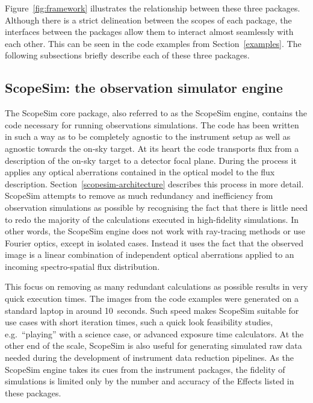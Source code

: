 Figure~\ref{fig:framework} illustrates the relationship between these three packages.
Although there is a strict delineation between the scopes of each package, the interfaces between the packages allow them to interact almost seamlessly with each other.
This can be seen in the code examples from Section~\ref{examples}.
The following subsections briefly describe each of these three packages.

\subsection{ScopeSim: the observation simulator engine}
\label{scopesim-the-observation-simulator-engine}

The ScopeSim core package, also referred to as the ScopeSim engine, contains the code necessary for running observations simulations.
The code has been written in such a way as to be completely agnostic to the instrument setup as well as agnostic towards the on-sky target.
At its heart the code transports flux from a description of the on-sky target to a detector focal plane.
During the process it applies any optical aberrations contained in the optical model to the flux description.
Section~\ref{scopesim-architecture} describes this process in more detail.
ScopeSim attempts to remove as much redundancy and inefficiency from observation simulations as possible by recognising the fact that there is little need to redo the majority of the calculations executed in high-fidelity simulations.
In other words, the ScopeSim engine does not work with ray-tracing methods or use Fourier optics, except in isolated cases.
Instead it uses the fact that the observed image is a linear combination of independent optical aberrations applied to an incoming spectro-spatial flux distribution.

This focus on removing as many redundant calculations as possible results in very quick execution times.
The images from the code examples were generated on a standard laptop in around 10~seconds.
Such speed makes ScopeSim suitable for use cases with short iteration times, such a quick look feasibility studies, e.g.~``playing'' with a science case, or advanced exposure time calculators.
At the other end of the scale, ScopeSim is also useful for generating simulated raw data needed during the development of instrument data reduction pipelines.
As the ScopeSim engine takes its cues from the instrument packages, the fidelity of simulations is limited only by the number and accuracy of the Effects listed in these packages.


